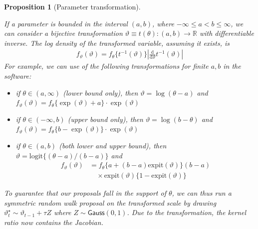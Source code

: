\documentclass[
  11pt,
  letterpaper,
]{scrbook}
\providecommand{\tightlist}{%
  \setlength{\itemsep}{0pt}\setlength{\parskip}{0pt}}\usepackage{longtable,booktabs,array}
\theoremstyle{definition}
\theoremstyle{plain}
\newtheorem{proposition}{Proposition}[chapter]
\theoremstyle{plain}
\theoremstyle{definition}
\theoremstyle{definition}
\theoremstyle{remark}
\begin{document}
\begin{proposition}[Parameter
transformation]\protect\hypertarget{prp-parameter-transformation}{}\label{prp-parameter-transformation}

If a parameter is bounded in the interval \((a,b)\), where
\(-\infty \leq a < b \leq \infty\), we can consider a bijective
transformation \(\vartheta \equiv t(\theta): (a,b) \to \mathbb{R}\) with
differentiable inverse. The log density of the transformed variable,
assuming it exists, is \begin{align*}
f_\vartheta(\vartheta) = f_{\theta}\{t^{-1}(\vartheta)\} \left| \frac{\mathrm{d}}{\mathrm{d} \vartheta} t^{-1}(\vartheta)\right|
\end{align*} For example, we can use of the following transformations
for finite \(a, b\) in the software:

\begin{itemize}
\tightlist
\item
  if \(\theta \in (a, \infty)\) (lower bound only), then
  \(\vartheta = \log(\theta-a)\) and
  \(f_{\vartheta}(\vartheta)=f_{\theta}\{\exp(\vartheta) + a\}\cdot \exp(\vartheta)\)
\item
  if \(\theta \in (-\infty, b)\) (upper bound only), then
  \(\vartheta = \log(b-\theta)\) and
  \(f_{\vartheta}(\vartheta)=f_{\theta}\{b-\exp(\vartheta)\}\cdot \exp(\vartheta)\)
\item
  if \(\theta \in (a, b)\) (both lower and upper bound), then
  \(\vartheta = \mathrm{logit}\{(\theta-a)/(b-a)\}\) and \begin{align*}
  f_{\vartheta}(\vartheta)&=f_{\theta}\{a+(b-a) \mathrm{expit}(\vartheta)\} (b-a)\\&\quad \times \mathrm{expit}(\vartheta)\{1-\mathrm{expit}(\vartheta)\}
  \end{align*}
\end{itemize}

To guarantee that our proposals fall in the support of \(\theta\), we
can thus run a symmetric random walk proposal on the \emph{transformed
scale} by drawing \(\vartheta_{t}^{\star} \sim \vartheta_{t-1}+\tau Z\)
where \(Z\sim\mathsf{Gauss}(0, 1)\). Due to the transformation, the
kernel ratio now contains the Jacobian.

\end{proposition}
\end{document}
